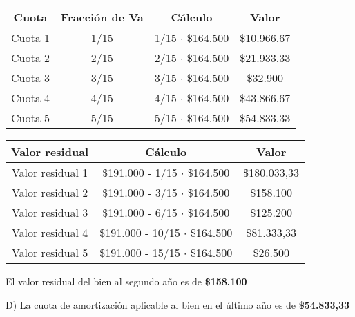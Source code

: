 \documentclass[12pt,a4paper]{article}
\begin{document}
        \newpage
        
        \begin{table}[H]
        \centering
        	\begin{tabular}{ | c | c | c | c | }
            	\hline
                Cuota	&	Fracción de Va	&	Cálculo					&	Valor		\\ \hline
                Cuota 1	&	1/15			&	1/15 $\cdot$ \$164.500	&	\$10.966,67	\\ \hline
                Cuota 2	&	2/15			&	2/15 $\cdot$ \$164.500	&	\$21.933,33	\\ \hline
                Cuota 3	&	3/15			&	3/15 $\cdot$ \$164.500	&	\$32.900	\\ \hline
                Cuota 4	&	4/15			&	4/15 $\cdot$ \$164.500	&	\$43.866,67	\\ \hline
                Cuota 5	&	5/15			&	5/15 $\cdot$ \$164.500	&	\$54.833,33	\\ \hline
			\end{tabular}
		\end{table}
        
        \begin{table}[H]
        \centering
        	\begin{tabular}{ | c | c | c | }
            	\hline
                Valor residual		&	Cálculo								&	Valor			\\ \hline
                Valor residual 1	&	\$191.000 - 1/15 $\cdot$ \$164.500	&	\$180.033,33	\\ \hline
                Valor residual 2	&	\$191.000 - 3/15 $\cdot$ \$164.500	&	\$158.100		\\ \hline
                Valor residual 3	&	\$191.000 - 6/15 $\cdot$ \$164.500	&	\$125.200		\\ \hline
                Valor residual 4	&	\$191.000 - 10/15 $\cdot$ \$164.500	&	\$81.333,33		\\ \hline
                Valor residual 5	&	\$191.000 - 15/15 $\cdot$ \$164.500	&	\$26.500		\\ \hline
			\end{tabular}
		\end{table}
        
        \par{
        	El valor residual del bien al segundo año es de \textbf{\$158.100}
            }
		
        \hrulefill
        
        D) La cuota de amortización aplicable al bien en el último año es de \textbf{\$54.833,33}
        
\end{document}
